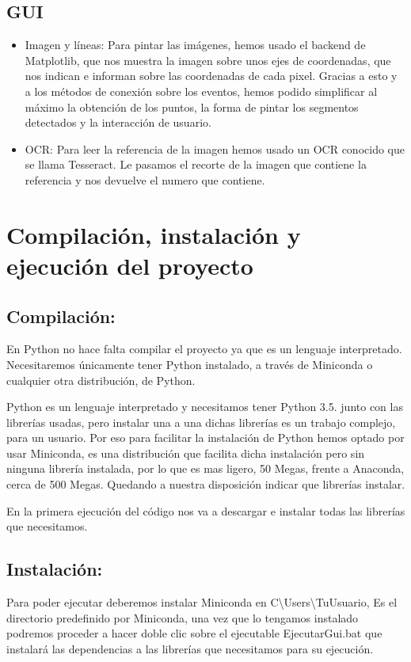 \subsection{GUI}

\begin{itemize}
	\item Imagen y líneas: Para pintar las imágenes, hemos usado el backend de Matplotlib, que nos muestra la imagen sobre unos ejes de coordenadas, que nos indican e informan sobre las coordenadas de cada pixel. Gracias a esto y a los métodos de conexión sobre los eventos, hemos podido simplificar al máximo la obtención de los puntos, la forma de pintar los segmentos detectados y la interacción de usuario.
	
	\item OCR: Para leer la referencia de la imagen hemos usado un OCR conocido que se llama Tesseract. Le pasamos el recorte de la imagen que contiene la referencia y nos devuelve el numero que contiene.
\end{itemize}

\section{Compilación, instalación y ejecución del proyecto}

\subsection{Compilación:}
En Python no hace falta compilar el proyecto ya que es un lenguaje interpretado. Necesitaremos únicamente tener Python instalado, a través de Miniconda o cualquier otra distribución, de Python.

Python es un lenguaje interpretado y necesitamos tener Python 3.5. junto con las librerías usadas, pero instalar una a una dichas librerías es un trabajo complejo, para un usuario. Por eso para facilitar la instalación de Python hemos optado por usar Miniconda, es una distribución que facilita dicha instalación pero sin ninguna librería instalada, por lo que es mas ligero, 50 Megas, frente a Anaconda, cerca de 500 Megas. Quedando a nuestra disposición indicar que librerías instalar.

En la primera ejecución del código nos va a descargar e instalar todas las librerías que necesitamos.

\subsection{Instalación:}
Para poder ejecutar deberemos instalar Miniconda en 
 \textrm{C\textbackslash Users\textbackslash TuUsuario}, Es el directorio predefinido por Miniconda, una vez que lo tengamos instalado podremos proceder a hacer doble clic sobre el ejecutable  \textrm{EjecutarGui.bat} que instalará las dependencias a las librerías que necesitamos para su ejecución.

